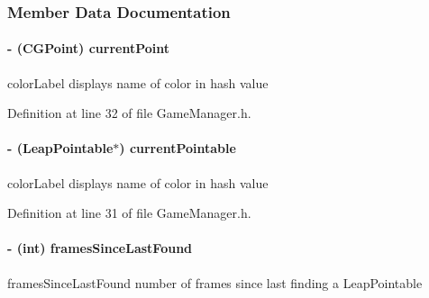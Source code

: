 \subsubsection{Member Data Documentation}
\hypertarget{interface_game_manager_a880d3cc994cc208b57a97fac088c2781}{
\paragraph[{current\-Point}]{\setlength{\rightskip}{0pt plus 5cm}-\/ (C\-G\-Point) current\-Point\hspace{0.3cm}{\ttfamily [protected]}}}\label{d4/d94/interface_game_manager_a880d3cc994cc208b57a97fac088c2781}
color\-Label displays name of color in hash value 

Definition at line 32 of file Game\-Manager.\-h.

\hypertarget{interface_game_manager_a9899e94be0e9364a59e5b76d5025d9f7}{
\paragraph[{current\-Pointable}]{\setlength{\rightskip}{0pt plus 5cm}-\/ (Leap\-Pointable$\ast$) current\-Pointable\hspace{0.3cm}{\ttfamily [protected]}}}\label{d4/d94/interface_game_manager_a9899e94be0e9364a59e5b76d5025d9f7}
color\-Label displays name of color in hash value 

Definition at line 31 of file Game\-Manager.\-h.

\hypertarget{interface_game_manager_a546c4660d830a79c27bc2a51da00df12}{
\paragraph[{frames\-Since\-Last\-Found}]{\setlength{\rightskip}{0pt plus 5cm}-\/ (int) frames\-Since\-Last\-Found\hspace{0.3cm}{\ttfamily [protected]}}}\label{d4/d94/interface_game_manager_a546c4660d830a79c27bc2a51da00df12}
frames\-Since\-Last\-Found number of frames since last finding a Leap\-Pointable 

